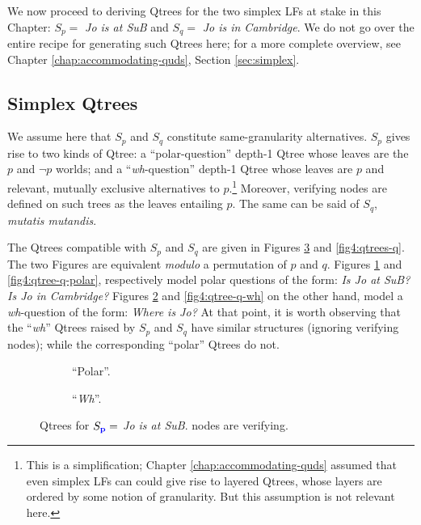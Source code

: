 We now proceed to deriving Qtrees for the two simplex LFs at stake in this Chapter: $S_p = $ \textit{Jo is at SuB} and $S_q = $ \textit{Jo is in Cambridge}. We do not go over the entire recipe for generating such Qtrees here; for a more complete overview, see Chapter \ref{chap:accommodating-quds}, Section \ref{sec:simplex}.

\subsection{Simplex Qtrees}
We assume here that $S_p$ and $S_q$ constitute same-granularity alternatives. $S_p$ gives rise to two kinds of Qtree: a ``polar-question'' depth-1 Qtree whose leaves are the $p$ and $\neg p$ worlds; and a ``\textit{wh}-question'' depth-1 Qtree whose leaves are $p$ and relevant, mutually exclusive alternatives to $p$.\footnote{This is a simplification; Chapter \ref{chap:accommodating-quds} assumed that even simplex LFs can could give rise to layered Qtrees, whose layers are ordered by some notion of granularity. But this assumption is not relevant here.} Moreover, verifying nodes are defined on such trees as the leaves entailing $p$. The same can be said of $S_q$, \textit{mutatis mutandis}.

The Qtrees compatible with $S_p$ and $S_q$ are given in Figures \ref{fig4:qtrees-p} and \ref{fig4:qtrees-q}. The two Figures are equivalent \textit{modulo} a permutation of $p$ and $q$.
Figures \ref{fig4:qtree-p-polar} and \ref{fig4:qtree-q-polar},  respectively model polar questions of the form: \textit{Is Jo at SuB?} \textit{Is Jo in Cambridge?} Figures \ref{fig4:qtree-p-wh} and \ref{fig4:qtree-q-wh} on the other hand, model a \textit{wh}-question of the form: \textit{Where is Jo?} At that point, it is worth observing that the ``\textit{wh}'' Qtrees raised by $S_p$ and $S_q$ have similar structures (ignoring verifying nodes); while the corresponding ``polar'' Qtrees do not.

\setlength{\fboxsep}{2pt}
	\begin{figure}[H]
		\centering
		\begin{subfigure}[b]{.45\linewidth}
			\centering
			\caption[]{``Polar''.}\label{fig4:qtree-p-polar}
		\end{subfigure}\hfill
		\begin{subfigure}[b]{.45\linewidth}
			\centering
			\caption[]{``\textit{Wh}''.}\label{fig4:qtree-p-wh}
		\end{subfigure}
		\caption[]{Qtrees for $S\protect_{\textbf{\textcolor{blue}{p}}}=$ \textit{Jo is at SuB}.  nodes are verifying.}
		\label{fig4:qtrees-p}
	\end{figure}
	
